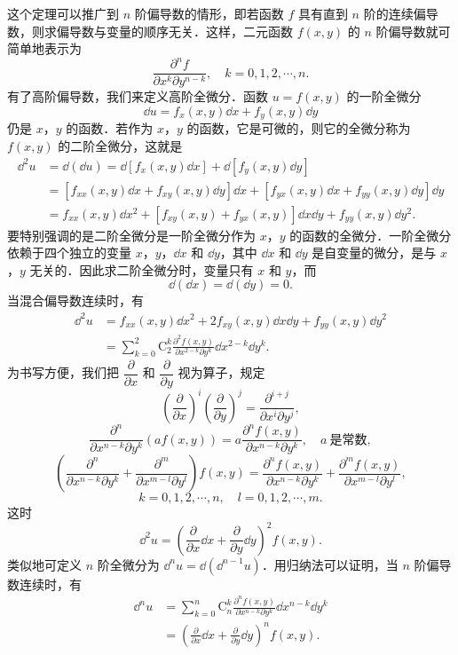 这个定理可以推广到 $n$ 阶偏导数的情形，即若函数 $f$ 具有直到 $n$ 阶的连续偏导数，则求偏导数与变量的顺序无关．这样，二元函数 $f(x,y)$ 的 $n$ 阶偏导数就可简单地表示为
\[
\frac{\partial^{n}f}{\partial x^{k}\partial y^{n-k}},\quad k=0,1,2,\cdots,n.
\]
有了高阶偏导数，我们来定义高阶全微分．函数 $u=f(x,y)$ 的一阶全微分
\[
\dd u=f_{x}(x,y)\dd x+f_{y}(x,y)\dd y
\]
仍是 $x$，$y$ 的函数．若作为 $x$，$y$ 的函数，它是可微的，则它的全微分称为 $f(x,y)$ 的二阶全微分，这就是
\[
\begin{aligned}
\dd^{2}u&=\dd(\dd u)=\dd\left[f_{x}(x,y)\dd x\right]+\dd\left[f_{y}(x,y)\dd y\right]\\
&=\left[f_{xx}(x,y)\dd x+f_{xy}(x,y)\dd y\right]\dd x+\left[f_{yx}(x,y)\dd x+f_{yy}(x,y)\dd y\right]\dd y\\
&=f_{xx}(x,y)\dd x^{2}+\left[f_{xy}(x,y)+f_{yx}(x,y)\right]\dd x\dd y+f_{yy}(x,y)\dd y^{2}.
\end{aligned}
\]
要特别强调的是二阶全微分是一阶全微分作为 $x$，$y$ 的函数的全微分．一阶全微分依赖于四个独立的变量 $x$，$y$，$\dd x$ 和 $\dd y$，其中 $\dd x$ 和 $\dd y$ 是自变量的微分，是与 $x$，$y$ 无关的．因此求二阶全微分时，变量只有 $x$ 和 $y$，而
\[
\dd(\dd x)=\dd(\dd y)=0.
\]
当混合偏导数连续时，有
\[
\begin{aligned}
\dd^{2}u&=f_{xx}(x,y)\dd x^{2}+2f_{xy}(x,y)\dd x\dd y+f_{yy}(x,y)\dd y^{2}\\
&=\sum_{k=0}^{2}\mathrm{C}_{2}^{k}\frac{\partial^{2}f(x,y)}{\partial x^{2-k}\partial y^{k}}\dd x^{2-k}\dd y^{k}.
\end{aligned}
\]
为书写方便，我们把 $\dfrac{\partial}{\partial x}$ 和 $\dfrac{\partial}{\partial y}$ 视为算子，规定
\[
\left(\frac{\partial}{\partial x}\right)^{i}\left(\frac{\partial}{\partial y}\right)^{j}=\frac{\partial^{i+j}}{\partial x^{i}\partial y^{j}},
\]
\[
\frac{\partial^{n}}{\partial x^{n-k}\partial y^{k}}(af(x,y))=a\frac{\partial^{n}f(x,y)}{\partial x^{n-k}\partial y^{k}},\quad a\ \text{是常数},
\]
\[
\left(\frac{\partial^{n}}{\partial x^{n-k}\partial y^{k}}+\frac{\partial^{m}}{\partial x^{m-l}\partial y^{l}}\right)f(x,y)=\frac{\partial^{n}f(x,y)}{\partial x^{n-k}\partial y^{k}}+\frac{\partial^{m}f(x,y)}{\partial x^{m-l}\partial y^{l}},
\]
\[
k=0,1,2,\cdots,n,\quad l=0,1,2,\cdots,m.
\]
这时
\[
\dd^{2}u=\left(\frac{\partial}{\partial x}\dd x+\frac{\partial}{\partial y}\dd y\right)^{2}f(x,y).
\]
类似地可定义 $n$ 阶全微分为 $\dd^{n}u=\dd(\dd^{n-1}u)$．用归纳法可以证明，当 $n$ 阶偏导数连续时，有
\[
\begin{aligned}
\dd^{n}u&=\sum_{k=0}^{n}\mathrm{C}_{n}^{k}\frac{\partial^{n}f(x,y)}{\partial x^{n-k}\partial y^{k}}\dd x^{n-k}\dd y^{k}\\
&=\left(\frac{\partial}{\partial x}\dd x+\frac{\partial}{\partial y}\dd y\right)^{n}f(x,y).
\end{aligned}
\]

